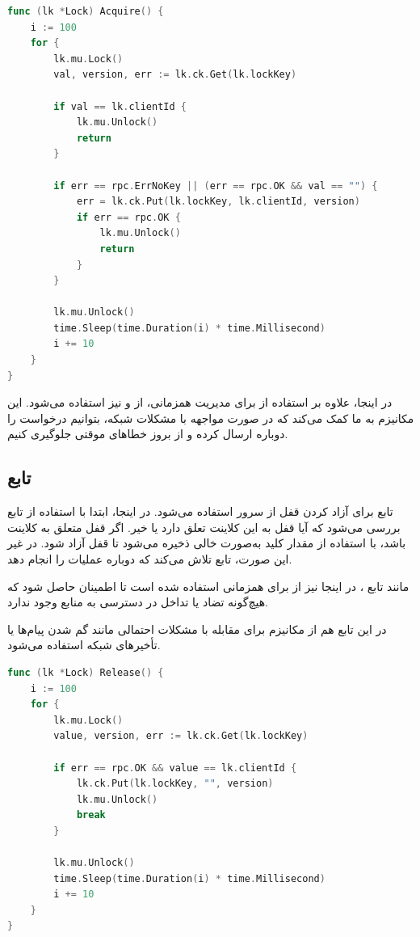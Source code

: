 \begin{latin}
\begin{lstlisting}[language=Go]
func (lk *Lock) Acquire() {
    i := 100
    for {
        lk.mu.Lock()
        val, version, err := lk.ck.Get(lk.lockKey)

        if val == lk.clientId {
            lk.mu.Unlock()
            return
        }

        if err == rpc.ErrNoKey || (err == rpc.OK && val == "") {
            err = lk.ck.Put(lk.lockKey, lk.clientId, version)
            if err == rpc.OK {
                lk.mu.Unlock()
                return
            }
        }

        lk.mu.Unlock()
        time.Sleep(time.Duration(i) * time.Millisecond)
        i += 10
    }
}
\end{lstlisting}
\end{latin}

در اینجا، علاوه بر استفاده از  برای مدیریت همزمانی، از  و  نیز استفاده می‌شود. این مکانیزم به ما کمک می‌کند که در صورت مواجهه با مشکلات شبکه، بتوانیم درخواست را دوباره ارسال کرده و از بروز خطاهای موقتی جلوگیری کنیم.

\subsection*{تابع }

تابع  برای آزاد کردن قفل از سرور استفاده می‌شود. در اینجا، ابتدا با استفاده از تابع  بررسی می‌شود که آیا قفل به این کلاینت تعلق دارد یا خیر. اگر قفل متعلق به کلاینت باشد، با استفاده از  مقدار کلید به‌صورت خالی ذخیره می‌شود تا قفل آزاد شود. در غیر این صورت، تابع تلاش می‌کند که دوباره عملیات  را انجام دهد.

مانند تابع ، در اینجا نیز از  برای همزمانی استفاده شده است تا اطمینان حاصل شود که هیچ‌گونه تضاد یا تداخل در دسترسی به منابع وجود ندارد.

در این تابع هم از مکانیزم  برای مقابله با مشکلات احتمالی مانند گم شدن پیام‌ها یا تأخیرهای شبکه استفاده می‌شود.

\begin{latin}
\begin{lstlisting}[language=Go]
func (lk *Lock) Release() {
    i := 100
    for {
        lk.mu.Lock()
        value, version, err := lk.ck.Get(lk.lockKey)

        if err == rpc.OK && value == lk.clientId {
            lk.ck.Put(lk.lockKey, "", version)
            lk.mu.Unlock()
            break
        }

        lk.mu.Unlock()
        time.Sleep(time.Duration(i) * time.Millisecond)
        i += 10
    }
}
\end{lstlisting}
\end{latin}


